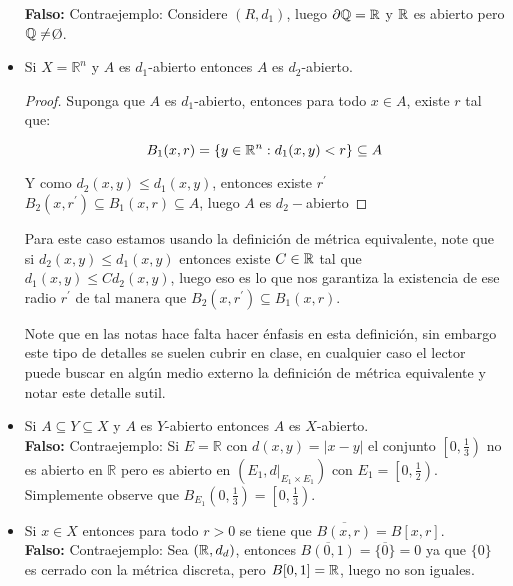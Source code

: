 \begin{itemize}[leftmargin=*]
\textbf{Falso:} Contraejemplo: Considere $(R,d_1)$, luego $\partial \mathbb{Q}=\mathbb{R}$ y $\mathbb{R}$ es abierto pero $\mathbb{Q}\neq$\O.



\item Si $X=\mathbb{R}^n$ y $A$ es $d_1$-abierto entonces $A$ es $d_2$-abierto.\\

\begin{proof}
Suponga que $A$ es $d_1$-abierto, entonces para todo $x\in A$, existe $r$ tal que:
 
$$B_1(x,r)=\{y\in \mathbb{R}^{n} : d_1(x,y)<r\}\subseteq A$$

Y como $d_2(x,y)\leq d_1(x,y)$, entonces existe $r^{\prime}$ $B_2(x,r^{\prime})\subseteq B_1(x,r)\subseteq A$, luego $A$ es $d_2-$abierto

\end{proof}

\begin{note}
Para este caso estamos usando la definición de métrica equivalente, note que si $d_2(x,y)\leq d_1(x,y)$ entonces existe $C\in \mathbb{R}$ tal que $d_1(x,y)\leq C d_2(x,y)$, luego eso es lo que nos garantiza la existencia de ese radio $r^{\prime}$ de tal manera que $B_2(x,r^{\prime})\subseteq B_1(x,r)$. 
\end{note}

\begin{note}
Note que en las notas hace falta hacer énfasis en esta definición, sin embargo este tipo de detalles se suelen cubrir en clase, en cualquier caso el lector puede buscar en algún medio externo la definición de métrica equivalente y notar este detalle sutil.
\end{note}



\item Si $A \subseteq Y \subseteq X$ y $A$ es $Y$-abierto entonces $A$ es $X$-abierto.\\

\textbf{Falso: } Contraejemplo: Si $E=\mathbb{R}$ con $d(x, y)=|x-y|$ el conjunto $\left[0, \frac{1}{3}\right)$ no es abierto en $\mathbb{R}$ pero es abierto en $\left(E_1,\left.d\right|_{E_1 \times E_1}\right)$ con $E_1=\left[0, \frac{1}{2}\right)$. Simplemente observe que $B_{E_1}\left(0, \frac{1}{3}\right)=\left[0, \frac{1}{3}\right)$.

\item Si $x \in X$ entonces para todo $r>0$ se tiene que $\overline{B(x, r)}=B[x, r]$.\\

\textbf{Falso:} Contraejemplo: Sea $(\mathbb{R},d_d)$, entonces $\overline{B(0,1)}=\overline{\{0\}}=0$ ya que $\{0\}$ es cerrado con la métrica discreta, pero $B[0,1]=\mathbb{R}$, luego no son iguales.

\end{itemize}

